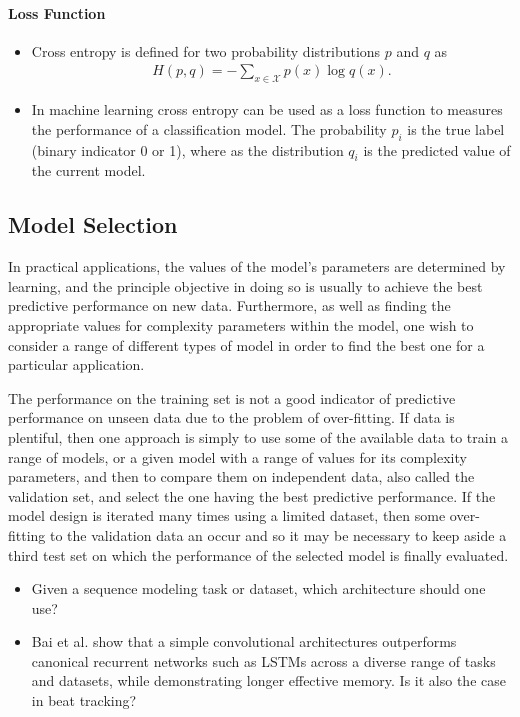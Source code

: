 \documentclass{scrartcl}
\begin{document}
\paragraph{Loss Function}
\begin{itemize}
\item Cross entropy is defined for two probability distributions $p$ and $q$ as
\begin{align}
H(p,q) = - \sum_{x \in \mathcal X} p(x) \log q(x).
\end{align} 
\item In machine learning cross entropy can be used as a loss function to measures the performance of a classification model. The probability $p_{i}$ is the true label (binary indicator 0 or 1), where as the distribution $q_{i}$ is the predicted value of the current model. 
\end{itemize}



\subsection{Model Selection}

In practical applications, the values of the model's parameters are determined by learning, and the principle objective in doing so is usually to achieve the best predictive performance on new data. Furthermore, as well as finding the appropriate values for complexity parameters within the model, one wish to consider a range of different types of model in order to find the best one for a particular application. 

The performance on the training set is not a good indicator of predictive performance on unseen data due to the problem of over-fitting. If data is plentiful, then one approach is simply to use some of the available data to train a range of models, or a given model with a range of values for its complexity parameters, and then to compare them on independent data, also called the validation set, and select the one having the best predictive performance. If the model design is iterated many times using a limited dataset, then some over-fitting to the validation data an occur and so it may be necessary to keep aside a third test set on which the performance of the selected model is finally evaluated. 


\begin{itemize}
\item Given a sequence modeling task or dataset, which architecture should one use?
\item Bai et al. \cite{Bai2018} show that a simple convolutional architectures outperforms canonical recurrent networks such as LSTMs across a diverse range of tasks and datasets, while demonstrating longer effective memory. Is it also the case in beat tracking?
\end{itemize}
\end{document}
